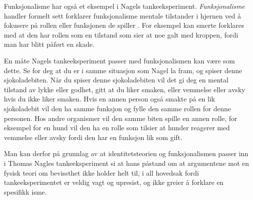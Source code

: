 Funksjonalisme har også et eksempel i Nagels tankeeksperiment. 
\textit{Funksjonalisme} handler formelt sett forklarer funksjonalisme mentale tilstander i hjernen ved å fokusere på rollen eller funksjonen de spiller \autocite{snl:funksjonalisme}. For eksempel kan smerte forklares med at den har rollen som en tilstand som sier at noe galt med kroppen, fordi man har blitt påført en skade.

En måte Nagels tankeeksperiment passer med funksjonalismen kan være som dette. 
Se for deg at du er i samme situasjon som Nagel la fram, og spiser denne sjokoladebiten.
Når du spiser denne sjokoladebiten vil det gi deg en mental tilstand av lykke eller godhet, gitt at du liker smaken, eller vemmelse eller avsky hvis du ikke liker smaken.
Hvis en annen person også smakte på en lik sjokoladebit vil den ha samme funksjon og fylle den samme rollen for denne personen. 
Hos andre organismer vil den samme biten spille en annen rolle, for eksempel for en hund vil den ha en rolle som tilsier at hunder reagerer med vemmelse eller avsky fordi den har en funksjon lik som gift.

Man kan derfor på grunnlag av at identitetsteorien og funksjonalismen passer inn i \mbox{Thomas} Nagles tankeeksperiment si at hans påstand om at argumentene mot en fysisk teori om bevissthet ikke holder helt til, i all hovedsak fordi tankeeksperimentet er veldig vagt og upresist, og ikke greier å forklare en spesifikk isme. 